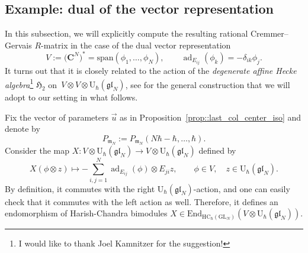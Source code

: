 \documentclass[10pt,a4paper]{amsart}
\numberwithin{equation}{section}
\newcommand{\C}{\mathbf{C}}
\newcommand{\U}{\mathrm{U}_{\hbar}}
\newcommand{\GL}{\mathrm{GL}}
\newcommand{\m}{\mathfrak{m}}
\DeclareMathOperator{\ad}{ad}
\newcommand{\End}{\mathrm{End}}
\newcommand{\HC}{\mathrm{HC}_{\hbar}}
\newcommand{\gl}{\mathfrak{gl}}
\begin{document}
	\subsection{Example: dual of the vector representation}
	\label{subsect:vector_rep_constant}
	
	In this subsection, we will explicitly compute the resulting rational Cremmer--Gervais $R$-matrix in the case of the dual vector representation
	\[
	V := \bigl(\C^N\bigr)^* = \mathrm{span}(\phi_1,\dots,\phi_N), \qquad \ad_{E_{ij}}(\phi_k) = -\delta_{ik} \phi_j.
	\]
	It turns out that it is closely related to the action of the \emph{degenerate affine Hecke algebra}\footnote{I would like to thank Joel Kamnitzer for the suggestion!} $\mathfrak{H}_2$ on~${V \otimes V \otimes \U(\gl_N)}$, see \cite[Example 2.1]{Cherednik} for the general construction that we will adopt to our setting in what follows.
	
	Fix the vector of parameters $\vec{u}$ as in Proposition~\ref{prop::last_col_center_iso} and denote by
	\[
	P_{\m_N} := P_{\m_N} (N\hbar-\hbar,\dots,\hbar).
	\]
	Consider the map $X\colon V \otimes \U(\gl_N) \rightarrow V \otimes \U(\gl_N)$ defined by
	\[
	X(\phi\otimes z) \mapsto -\sum_{i,j=1}^N \ad_{E_{ij}}(\phi) \otimes E_{ji} z,\qquad \phi \in V, \quad z\in \U(\gl_N).
	\]
	By definition, it commutes with the right $\U(\gl_N)$-action, and one can easily check that it commutes with the left action as well. Therefore, it defines an endomorphism of Harish-Chandra bimodules $X \in \End_{\HC(\GL_N)} (V \otimes \U(\gl_N))$.
	
\end{document}
